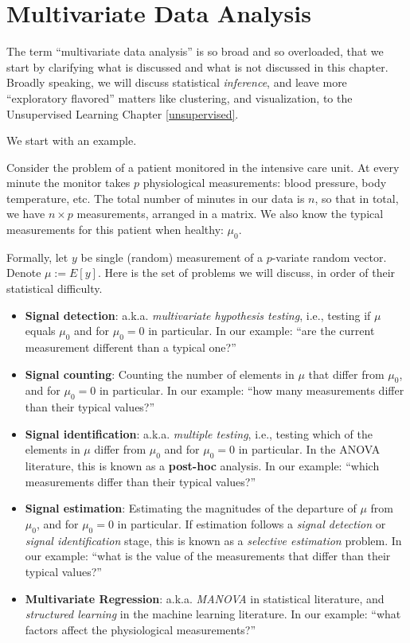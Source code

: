 \documentclass[]{book}
\theoremstyle{definition}
\theoremstyle{definition}
\theoremstyle{definition}
\theoremstyle{remark}
\let\BeginKnitrBlock\begin \let\EndKnitrBlock\end
\begin{document}
\chapter{Multivariate Data Analysis}\label{multivariate}

The term ``multivariate data analysis'' is so broad and so overloaded,
that we start by clarifying what is discussed and what is not discussed
in this chapter. Broadly speaking, we will discuss statistical
\emph{inference}, and leave more ``exploratory flavored'' matters like
clustering, and visualization, to the Unsupervised Learning Chapter
\ref{unsupervised}.

We start with an example.

\BeginKnitrBlock{example}
\protect\hypertarget{exm:icu}{}{\label{exm:icu} }Consider the problem of a
patient monitored in the intensive care unit. At every minute the
monitor takes \(p\) physiological measurements: blood pressure, body
temperature, etc. The total number of minutes in our data is \(n\), so
that in total, we have \(n \times p\) measurements, arranged in a
matrix. We also know the typical measurements for this patient when
healthy: \(\mu_0\).
\EndKnitrBlock{example}

Formally, let \(y\) be single (random) measurement of a \(p\)-variate
random vector. Denote \(\mu:=E[y]\). Here is the set of problems we will
discuss, in order of their statistical difficulty.

\begin{itemize}
\item
  \textbf{Signal detection}: a.k.a. \emph{multivariate hypothesis
  testing}, i.e., testing if \(\mu\) equals \(\mu_0\) and for
  \(\mu_0=0\) in particular. In our example: ``are the current
  measurement different than a typical one?''
\item
  \textbf{Signal counting}: Counting the number of elements in \(\mu\)
  that differ from \(\mu_0\), and for \(\mu_0=0\) in particular. In our
  example: ``how many measurements differ than their typical values?''
\item
  \textbf{Signal identification}: a.k.a. \emph{multiple testing}, i.e.,
  testing which of the elements in \(\mu\) differ from \(\mu_0\) and for
  \(\mu_0=0\) in particular. In the ANOVA literature, this is known as a
  \textbf{post-hoc} analysis. In our example: ``which measurements
  differ than their typical values?''
\item
  \textbf{Signal estimation}: Estimating the magnitudes of the departure
  of \(\mu\) from \(\mu_0\), and for \(\mu_0=0\) in particular. If
  estimation follows a \emph{signal detection} or \emph{signal
  identification} stage, this is known as a \emph{selective estimation}
  problem. In our example: ``what is the value of the measurements that
  differ than their typical values?''
\item
  \textbf{Multivariate Regression}: a.k.a. \emph{MANOVA} in statistical
  literature, and \emph{structured learning} in the machine learning
  literature. In our example: ``what factors affect the physiological
  measurements?''
\end{itemize}
\end{document}
